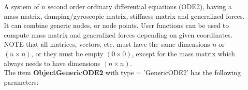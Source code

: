 \newpage

A system of $n$ second order ordinary differential equations (ODE2), having a mass matrix, damping/gyroscopic matrix, stiffness matrix and generalized forces. It can combine generic nodes, or node points. User functions can be used to compute mass matrix and generalized forces depending on given coordinates. NOTE that all matrices, vectors, etc. must have the same dimensions $n$ or $(n \times n)$, or they must be empty $(0 \times 0)$, except for the mass matrix which always needs to have dimensions $(n \times n)$.
 \\\vspace{12pt} \noindent The item {\bf ObjectGenericODE2} with type = 'GenericODE2' has the following parameters:\vspace{-1cm}\\ 

